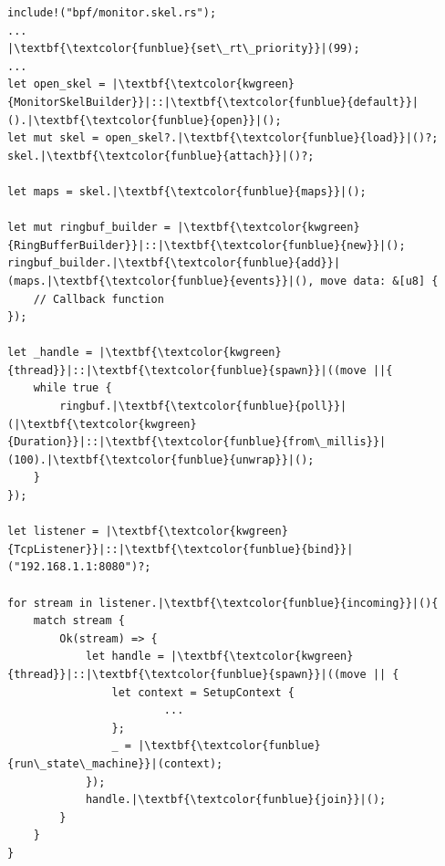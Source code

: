 \label{a:somelabel}
\begin{listing}[H]
    \centering
\begin{verbatim}
include!("bpf/monitor.skel.rs");
...
|\textbf{\textcolor{funblue}{set\_rt\_priority}}|(99);
...
let open_skel = |\textbf{\textcolor{kwgreen}{MonitorSkelBuilder}}|::|\textbf{\textcolor{funblue}{default}}|().|\textbf{\textcolor{funblue}{open}}|();
let mut skel = open_skel?.|\textbf{\textcolor{funblue}{load}}|()?;
skel.|\textbf{\textcolor{funblue}{attach}}|()?;

let maps = skel.|\textbf{\textcolor{funblue}{maps}}|();

let mut ringbuf_builder = |\textbf{\textcolor{kwgreen}{RingBufferBuilder}}|::|\textbf{\textcolor{funblue}{new}}|();
ringbuf_builder.|\textbf{\textcolor{funblue}{add}}|(maps.|\textbf{\textcolor{funblue}{events}}|(), move data: &[u8] {
    // Callback function
});

let _handle = |\textbf{\textcolor{kwgreen}{thread}}|::|\textbf{\textcolor{funblue}{spawn}}|((move ||{
    while true {
        ringbuf.|\textbf{\textcolor{funblue}{poll}}|(|\textbf{\textcolor{kwgreen}{Duration}}|::|\textbf{\textcolor{funblue}{from\_millis}}|(100).|\textbf{\textcolor{funblue}{unwrap}}|();
    }
});

let listener = |\textbf{\textcolor{kwgreen}{TcpListener}}|::|\textbf{\textcolor{funblue}{bind}}|("192.168.1.1:8080")?;

for stream in listener.|\textbf{\textcolor{funblue}{incoming}}|(){
    match stream {
        Ok(stream) => {
            let handle = |\textbf{\textcolor{kwgreen}{thread}}|::|\textbf{\textcolor{funblue}{spawn}}|((move || {
                let context = SetupContext {
                        ...
                };
                _ = |\textbf{\textcolor{funblue}{run\_state\_machine}}|(context);
            });
            handle.|\textbf{\textcolor{funblue}{join}}|();
        }
    }
}
\end{verbatim}

\caption{Parts of the setup state of the server}
\label{lst:setup}
\end{listing}

